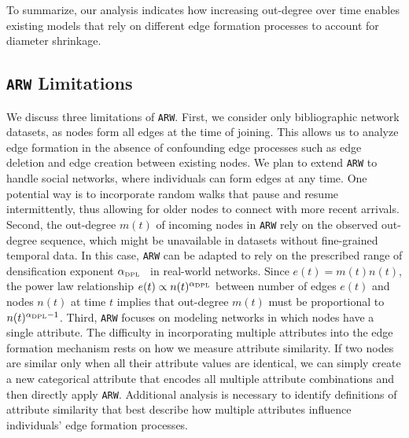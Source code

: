 To summarize, our analysis indicates how increasing out-degree over time enables
existing models that rely on different edge formation processes to account for
diameter shrinkage.


\subsection{\texttt{ARW} Limitations}
We discuss three limitations of \texttt{ARW}. First, we  consider only
bibliographic  network datasets, as nodes form all edges at the time of joining.
This allows us to analyze edge formation in the absence of confounding edge
processes such as edge deletion and edge creation between existing nodes. We
plan to extend \texttt{ARW} to handle social networks, where individuals can
form edges at any time. One potential way is to incorporate random walks that
pause and resume intermittently, thus allowing for older nodes to connect with
more recent arrivals.
Second, the out-degree $m(t)$ of incoming nodes in \texttt{ARW} rely on the
observed out-degree sequence, which might be unavailable in
datasets without fine-grained temporal data. In this case, \texttt{ARW}
can be adapted to rely on the prescribed range of densification exponent $\alpha_{\tiny \mbox{DPL}}$~\cite{leskovec2005graphs}
in real-world networks.
Since $e(t)=m(t)n(t)$, the power law relationship $e(t) \propto n(t)^{\alpha_{\tiny \mbox{DPL}}}$ between
number of edges $e(t)$ and nodes $n(t)$ at time $t$ implies that out-degree $m(t)$ must be proportional
to $n(t)^{\alpha_{\tiny \mbox{DPL}}-1}$.
Third, \texttt{ARW} focuses on modeling networks in which nodes have a single attribute.
The difficulty in incorporating multiple attributes into the edge formation mechanism rests
on how we measure attribute similarity. If two nodes are similar only when all their
attribute values are identical, we can simply create a new categorical attribute that encodes all
multiple attribute combinations and then directly apply \texttt{ARW}.
Additional analysis is necessary to identify definitions of attribute similarity that best
describe how multiple attributes influence individuals' edge formation processes.


